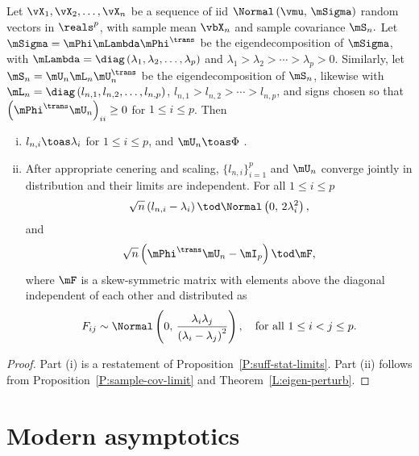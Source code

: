 \begin{theorem}
Let $\vX_1, \vX_2, \ldots, \vX_n$ be a sequence of iid 
\(
    \Normal \left(
        \vmu, \,
        \mSigma
    \right)
\)
random vectors in $\reals^p$, with sample mean
\(
    \vbX_n
\)
and sample covariance
\(
    \mS_n.
\)
Let $\mSigma = \mPhi \mLambda \mPhi^\trans$ be the eigendecomposition
of $\mSigma$, with
\(
    \mLambda = \diag \left(
        \lambda_1,
        \lambda_2,
        \ldots,
        \lambda_p
    \right)
\)
and
\(
    \lambda_1 > \lambda_2 > \cdots > \lambda_p > 0
\).
Similarly, let $\mS_n = \mU_n \mL_n \mU_n^\trans$ be the eigendecomposition of $\mS_n$, likewise with
\(
    \mL_n = \diag \left(
        l_{n,1},
        l_{n,2},
        \ldots,
        l_{n,p}
    \right)
\),
\(
    l_{n,1} > l_{n,2} > \cdots > l_{n,p}
\),
and signs chosen so that
\(
    \left( \mPhi^\trans \mU_n \right)_{ii} \geq 0
\)
for $1 \leq i \leq p$.  Then
\begin{enumerate}[(i)]
    \item $l_{n,i} \toas \lambda_i$ for
        $1 \leq i \leq p$, and $\mU_n \toas \Phi$ .
    \item 
        After appropriate cenering and scaling, 
	$\{ l_{n,i} \}_{i=1}^p$ and $\mU_n$
        converge jointly in distribution and their limits
        are independent.	
	For all $1 \leq i \leq p$
        \[
            \sqrt{n} \left( l_{n,i} - \lambda_i \right) 
            \tod 
            \Normal\left( 0, \, 2 \lambda_i^2 \right),
        \]
        and
        \[
            \sqrt{n} \left( \mPhi^\trans \mU_n - \mI_p \right) \tod \mF,
        \]
        where $\mF$ is a skew-symmetric matrix with elements above the 
	diagonal independent of each other and distributed as 
        \[
            F_{ij}
            \sim
            \Normal \left(
                0, \,
                \frac{\lambda_i \lambda_j}
                     {\left( \lambda_i - \lambda_j \right)^2}
            \right),
            \quad
            \text{for all $1 \leq i < j \leq p$.}
        \]
\end{enumerate}
\end{theorem}
\begin{proof}
Part (i) is a restatement of Proposition~\ref{P:suff-stat-limits}.  Part (ii) follows from Proposition~\ref{P:sample-cov-limit} and Theorem~\ref{L:eigen-perturb}.
\end{proof}


\section{Modern asymptotics}\label{S:multivariate-modern}

